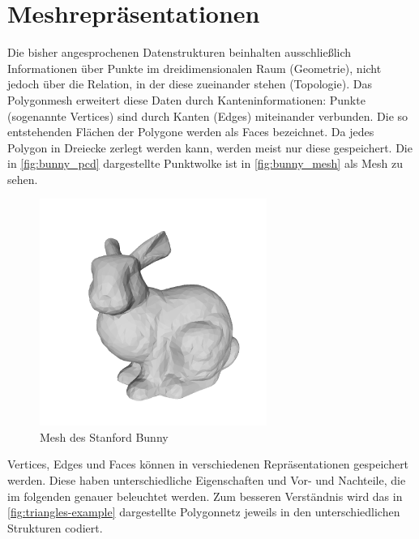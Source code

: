 \section{Meshrepräsentationen}
\label{sec:meshrepr}

Die bisher angesprochenen Datenstrukturen beinhalten ausschließlich Informationen über Punkte im dreidimensionalen Raum (Geometrie), nicht jedoch über die Relation, in der diese zueinander stehen (Topologie).
Das Polygonmesh erweitert diese Daten durch Kanteninformationen: Punkte (sogenannte Vertices) sind durch Kanten (Edges) miteinander verbunden.
Die so entstehenden Flächen der Polygone werden als Faces bezeichnet.
Da jedes Polygon in Dreiecke zerlegt werden kann, werden meist nur diese gespeichert.
Die in \autoref{fig:bunny_pcd} dargestellte Punktwolke ist in \autoref{fig:bunny_mesh} als Mesh zu sehen.

\begin{figure}[ht]
	\centering
	\includegraphics[width=0.66\textwidth, frame]{images/bunny_mesh.png}
	\caption{Mesh des Stanford Bunny \cite{stanfordbunny}}
	\label{fig:bunny_mesh}
\end{figure}

Vertices, Edges und Faces können in verschiedenen Repräsentationen gespeichert werden.
Diese haben unterschiedliche Eigenschaften und Vor- und Nachteile, die im folgenden genauer beleuchtet werden.
Zum besseren Verständnis wird das in \autoref{fig:triangles-example} dargestellte Polygonnetz jeweils in den unterschiedlichen Strukturen codiert.

